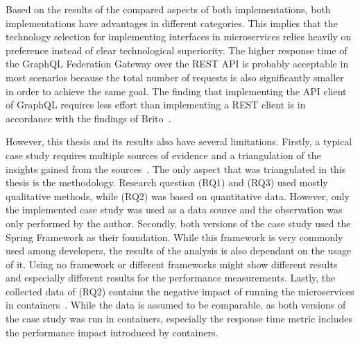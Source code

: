 Based on the results of the compared aspects of both implementations, both implementations have advantages in different categories.
This implies that the technology selection for implementing interfaces in microservices relies heavily on preference instead of clear technological superiority.
The higher response time of the GraphQL Federation Gateway over the \ac{REST} \ac{API} is probably acceptable in most scenarios because the total number of requests is also significantly smaller in order to achieve the same goal.
The finding that implementing the \ac{API} client of GraphQL requires less effort than implementing a \ac{REST} client is in accordance with the findings of Brito~\cite{Brito2020}.

However, this thesis and its results also have several limitations.
Firstly, a typical case study requires multiple sources of evidence and a triangulation of the insights gained from the sources~\cite{Runeson2012}.
The only aspect that was triangulated in this thesis is the methodology.
Research question (RQ1) and (RQ3) used mostly qualitative methods, while (RQ2) was based on quantitative data.
However, only the implemented case study was used as a data source and the observation was only performed by the author.
Secondly, both versions of the case study used the Spring Framework as their foundation.
While this framework is very commonly used among developers, the results of the analysis is also dependant on the usage of it.
Using no framework or different frameworks might show different results and especially different results for the performance measurements.
Lastly, the collected data of (RQ2) contains the negative impact of running the microservices in containers~\cite{Kratzke2017}.
While the data is assumed to be comparable, as both versions of the case study was run in containers, especially the response time metric includes the performance impact introduced by containers.
